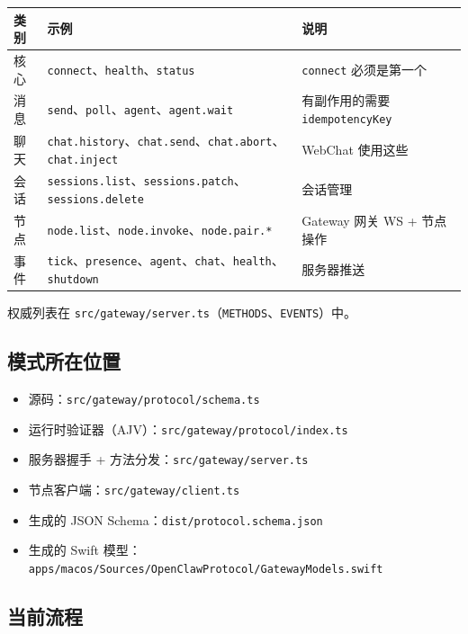 \begin{table}[h]
\centering
\small
\begin{tabular}{|l|l|l|}
\hline
类别 & 示例 & 说明 \\
\hline
核心 & \texttt{connect}、\texttt{health}、\texttt{status} & \texttt{connect} 必须是第一个 \\
\hline
消息 & \texttt{send}、\texttt{poll}、\texttt{agent}、\texttt{agent.wait} & 有副作用的需要 \texttt{idempotencyKey} \\
\hline
聊天 & \texttt{chat.history}、\texttt{chat.send}、\texttt{chat.abort}、\texttt{chat.inject} & WebChat 使用这些 \\
\hline
会话 & \texttt{sessions.list}、\texttt{sessions.patch}、\texttt{sessions.delete} & 会话管理 \\
\hline
节点 & \texttt{node.list}、\texttt{node.invoke}、\texttt{node.pair.*} & Gateway 网关 WS + 节点操作 \\
\hline
事件 & \texttt{tick}、\texttt{presence}、\texttt{agent}、\texttt{chat}、\texttt{health}、\texttt{shutdown} & 服务器推送 \\
\hline
\end{tabular}
\end{table}



权威列表在 \texttt{src/gateway/server.ts}（\texttt{METHODS}、\texttt{EVENTS}）中。

\subsection{模式所在位置}


\begin{itemize}
  \item 源码：\texttt{src/gateway/protocol/schema.ts}
  \item 运行时验证器（AJV）：\texttt{src/gateway/protocol/index.ts}
  \item 服务器握手 + 方法分发：\texttt{src/gateway/server.ts}
  \item 节点客户端：\texttt{src/gateway/client.ts}
  \item 生成的 JSON Schema：\texttt{dist/protocol.schema.json}
  \item 生成的 Swift 模型：\texttt{apps/macos/Sources/OpenClawProtocol/GatewayModels.swift}
\end{itemize}


\subsection{当前流程}


